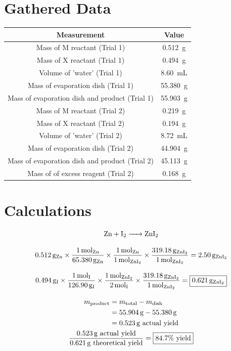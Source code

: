 \documentclass[titlepage]{article}
\begin{document}
\section{Gathered Data}
\begin{tabular}{ |c|c| }
    \hline
    Measurement & Value \\
    \hline
    Mass of M reactant (Trial 1) &  \qty{0.512}{\gram}\\
    Mass of X reactant (Trial 1) & \qty{0.494}{\gram} \\
    Volume of 'water' (Trial 1) & \qty{8.60}{\milli\liter} \\
    Mass of evaporation dish (Trial 1) & \qty{55.380}{\gram} \\
    Mass of evaporation dish and product (Trial 1) & \qty{55.903}{\gram} \\
    Mass of M reactant (Trial 2) & \qty{0.219}{\gram} \\
    Mass of X reactant (Trial 2) & \qty{0.194}{\gram} \\
    Volume of 'water' (Trial 2) & \qty{8.72}{\milli\liter} \\
    Mass of evaporation dish (Trial 2) & \qty{44.904}{\gram} \\
    Mass of evaporation dish and product (Trial 2) & \qty{45.113}{\gram} \\
    Mass of of excess reagent (Trial 2) & \qty{0.168}{\gram} \\
    \hline
    \end{tabular}
\section{Calculations}
\begin{gather*}
    \ce{Zn + I2 -> ZnI2} \\[2ex]
    \qty{0.512}{\gram\of{Zn}}\times\frac{\qty{1}{\mol\of{Zn}}}{\qty{65.380}{\gram\of{Zn}}}\times\frac{\qty{1}{\mol\of{Zn}}}{\qty{1}{\mol\of{\ce{ZnI2}}}}\times\frac{\qty{319.18}{\gram\of{\ce{ZnI2}}}}{\qty{1}{\mol\of{\ce{ZnI2}}}}=\qty{2.50}{\gram\of{\ce{ZnI2}}} \\[2ex]
    \qty{0.494}{\gram\of{I}}\times\frac{\qty{1}{\mol\of{I}}}{\qty{126.90}{\gram\of{I}}}\times\frac{\qty{1}{\mol\of{\ce{ZnI2}}}}{\qty{2}{\mol\of{I}}}\times\frac{\qty{319.18}{\gram\of{\ce{ZnI2}}}}{\qty{1}{\mol\of{\ce{ZnI2}}}}=\boxed{\qty{0.621}{\gram\of{\ce{ZnI2}}}} \\[2ex]
    \begin{split}
    m_{\text{product}} &= m_{\text{total}} - m_{\text{dish}} \\
                       &= \qty{55.904}{\gram} - \qty{55.380}{\gram} \\
                       &= \qty{0.523}{\gram} \text{ actual yield} \\
    \end{split} \\
    \frac{\qty{0.523}{\gram}\mathrm{\ actual\ yield}}{\qty{0.621}{\gram}\mathrm{\ theoretical\ yield}}=\boxed{84.7\unit{\percent}\mathrm{\ yield}}
\end{gather*}
\end{document}
